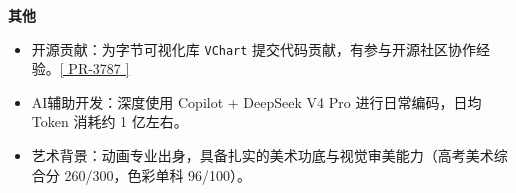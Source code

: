 \documentclass[11pt]{article}
\newcommand{\sectionheader}[1]{%
    \vspace{10pt}%
    \noindent\textcolor{sectionColor}{\textbf{\Large #1}}%
    \vspace{2pt}%
    \hrulefill
    \vspace{6pt}%
}
\newcommand{\entry}[5]{%
    \noindent\textcolor{nameColor}{\textbf{#1}} \hfill \textcolor{dateColor}{\textit{#2}} \\
    \textcolor{dateColor}{\textit{#3}} \hfill \textcolor{dateColor}{\textit{#4}} \\
    \textcolor{bodyColor}{#5}%
    \vspace{6pt}%
}
\begin{document}


\sectionheader{其他}
\begin{itemize}
    \item \textcolor{bodyColor}{开源贡献：为字节可视化库 \texttt{VChart} 提交代码贡献，有参与开源社区协作经验。\href{https://github.com/VisActor/VChart/pull/3787}{[ PR-3787 ]}}
    \item \textcolor{bodyColor}{AI辅助开发：深度使用 Copilot + DeepSeek V4 Pro 进行日常编码，日均 Token 消耗约 1 亿左右。}
    \item \textcolor{bodyColor}{艺术背景：动画专业出身，具备扎实的美术功底与视觉审美能力（高考美术综合分 260/300，色彩单科 96/100）。}
\end{itemize}
\end{document}
